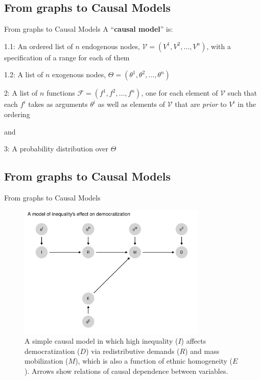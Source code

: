 \documentclass[
  11pt,
  ignorenonframetext,
]{beamer}
\begin{document}
\hypertarget{from-graphs-to-causal-models}{%
\subsection{From graphs to Causal
Models}\label{from-graphs-to-causal-models}}

\begin{frame}{From graphs to Causal Models}
A ``\textbf{causal model}'' is:

1.1: An ordered list of \(n\) endogenous nodes,
\(\mathcal{V}= (V^1, V^2,\dots, V^n)\), with a specification of a range
for each of them

1.2: A list of \(n\) exogenous nodes,
\(\Theta = (\theta^1, \theta^2,\dots , \theta^n)\)

2: A list of \(n\) functions \(\mathcal{F}= (f^1, f^2,\dots, f^n)\), one
for each element of \(\mathcal{V}\) such that each \(f^i\) takes as
arguments \(\theta^i\) as well as elements of \(\mathcal{V}\) that are
\emph{prior} to \(V^i\) in the ordering

and

3: A probability distribution over \(\Theta\)
\end{frame}

\hypertarget{from-graphs-to-causal-models-1}{%
\subsection{From graphs to Causal
Models}\label{from-graphs-to-causal-models-1}}

\begin{frame}{From graphs to Causal Models}
\begin{figure}

{\centering \includegraphics[width=0.8\textwidth,height=\textheight]{2.1_causality_files/figure-beamer/HJ-F-2-1-1.pdf}

}

\caption{A simple causal model in which high inequality (\(I\)) affects
democratization (\(D\)) via redistributive demands (\(R\)) and mass
mobilization (\(M\)), which is also a function of ethnic homogeneity
(\(E\)). Arrows show relations of causal dependence between variables.}

\end{figure}
\end{frame}
\end{document}
